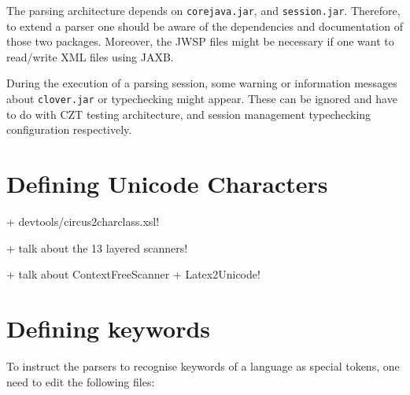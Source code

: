 \documentclass{article}
\begin{document}
The parsing architecture depends on \texttt{corejava.jar}, and
\texttt{session.jar}. Therefore, to extend a parser one should be aware of the
dependencies and documentation of those two packages. Moreover, the JWSP files
might be necessary if one want to read/write XML files using JAXB.

During the execution of a parsing session, some warning or information messages
about \texttt{clover.jar} or typechecking might appear. These can be ignored
and have to do with CZT testing architecture, and session management
typechecking configuration respectively.

\section{Defining Unicode Characters}

+ devtools/circus2charclass.xsl!

+ talk about the 13 layered scanners!

+ talk about ContextFreeScanner + Latex2Unicode!

\section{Defining keywords}\label{defining-keywords}

To instruct the parsers to recognise keywords of a language as special tokens,
one need to edit the following files:
\end{document}
